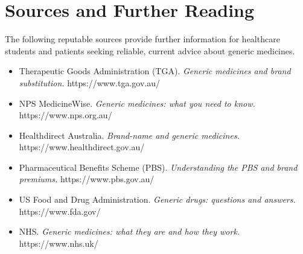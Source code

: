 \section*{Sources and Further Reading}
The following reputable sources provide further information for healthcare students and patients seeking reliable, current advice about generic medicines.

\begin{itemize}
    \item Therapeutic Goods Administration (TGA). \textit{Generic medicines and brand substitution.} https://www.tga.gov.au/
    \item NPS MedicineWise. \textit{Generic medicines: what you need to know.} https://www.nps.org.au/
    \item Healthdirect Australia. \textit{Brand-name and generic medicines.} https://www.healthdirect.gov.au/
    \item Pharmaceutical Benefits Scheme (PBS). \textit{Understanding the PBS and brand premiums.} https://www.pbs.gov.au/
    \item US Food and Drug Administration. \textit{Generic drugs: questions and answers.} https://www.fda.gov/
    \item NHS. \textit{Generic medicines: what they are and how they work.} https://www.nhs.uk/
\end{itemize}

